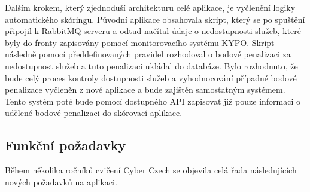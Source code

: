 \documentclass[
  digital, %
  twoside, %
  table,   %
  nolof,     %
  nolot,     %
]{fithesis3}
\begin{document}
Dalším krokem, který zjednoduší architekturu celé aplikace, je vyčlenění logiky automatického skóringu. Původní aplikace obsahovala skript, který se po spuštění připojil k RabbitMQ serveru a odtud načítal údaje o nedostupnosti služeb, které byly do fronty zapisovány pomocí monitorovacího systému KYPO. Skript následně pomocí předdefinovaných pravidel rozhodoval o bodové penalizaci za nedostupnost služeb a tuto penalizaci ukládal do databáze. Bylo rozhodnuto, že bude celý proces kontroly dostupnosti služeb a vyhodnocování případné bodové penalizace vyčleněn z nové aplikace a bude zajištěn samostatným systémem. Tento systém poté bude pomocí dostupného API zapisovat již pouze informaci o udělené bodové penalizaci do skórovací aplikace.

\subsection{Funkční požadavky}

Během několika ročníků cvičení Cyber Czech se objevila celá řada následujících nových požadavků na aplikaci.
\end{document}
